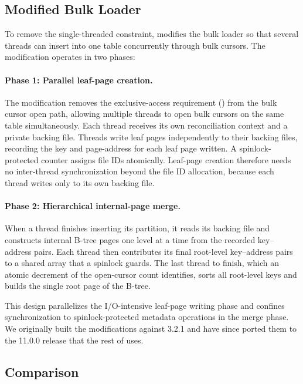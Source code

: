 \subsection{Modified \wt{} Bulk Loader}
\label{arch:bulk-modified}

To remove the single-threaded constraint, \project{} modifies the \wt{} bulk loader so that several threads can insert into one table concurrently through bulk cursors.
The modification operates in two phases:

\paragraph{Phase 1: Parallel leaf-page creation.}
The modification removes the exclusive-access requirement () from the bulk cursor open path, allowing multiple threads to open bulk cursors on the same table simultaneously.
Each thread receives its own reconciliation context and a private backing file.
Threads write leaf pages independently to their backing files, recording the key and page-address for each leaf page written.
A spinlock-protected counter assigns file IDs atomically.
Leaf-page creation therefore needs no inter-thread synchronization beyond the file ID allocation, because each thread writes only to its own backing file.

\paragraph{Phase 2: Hierarchical internal-page merge.}
When a thread finishes inserting its partition, it reads its backing file and constructs internal B-tree pages one level at a time from the recorded key--address pairs.
Each thread then contributes its final root-level key--address pairs to a shared array that a spinlock guards.
The last thread to finish, which an atomic decrement of the open-cursor count identifies, sorts all root-level keys and builds the single root page of the B-tree.

This design parallelizes the I/O-intensive leaf-page writing phase and confines synchronization to spinlock-protected metadata operations in the merge phase.
We originally built the modifications against \wt{} 3.2.1 and have since ported them to the \wt{} 11.0.0 release that the rest of \project{} uses.

\subsection{Comparison}
\label{arch:bulk-comparison}


